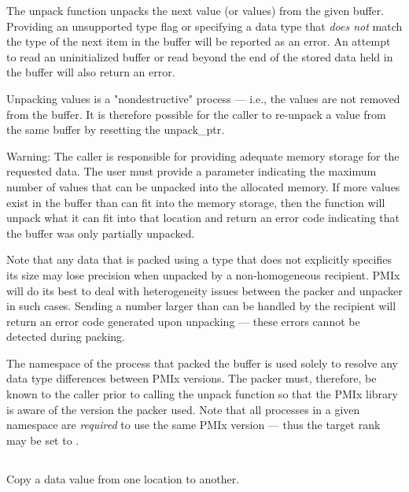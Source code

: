 \descr

The unpack function unpacks the next value (or values) from the given buffer. Providing an unsupported type flag 
or specifying a data type that \textit{does not} match the type of the next item in the buffer will be reported as an error. 
An attempt to read an uninitialized buffer or read beyond the end of the stored data held in the buffer will also return an error.

Unpacking values is a "nondestructive" process --- i.e., the values are not removed from the buffer. It is therefore possible for the caller to re-unpack a value from the same buffer by resetting the unpack_ptr.

Warning: The caller is responsible for providing adequate memory storage for the requested data. The user must provide a parameter indicating the maximum number of values that can be unpacked into the allocated memory. If more values exist in the buffer than can fit into the memory storage, then the function will unpack what it can fit into that location and return an error code indicating that the buffer was only partially unpacked.

Note that any data that is packed using a type that does not explicitly specifies its size may lose precision when unpacked by a non-homogeneous recipient. \ac{PMIx} will do its best to deal with heterogeneity issues between the packer and unpacker in such cases. Sending a number larger than can be handled by the recipient will return an error code generated upon unpacking --- these errors cannot be detected during packing.

The namespace of the process that packed the buffer is used solely to resolve any data type
differences between \ac{PMIx} versions. The packer must, therefore, be
known to the caller prior to calling the unpack function so that the
\ac{PMIx} library is aware of the version the packer used. Note that
all processes in a given namespace are \textit{required} to use the same \ac{PMIx}
version --- thus the target rank may be set to .  


\subsection{}

\summary

Copy a data value from one location to another.

